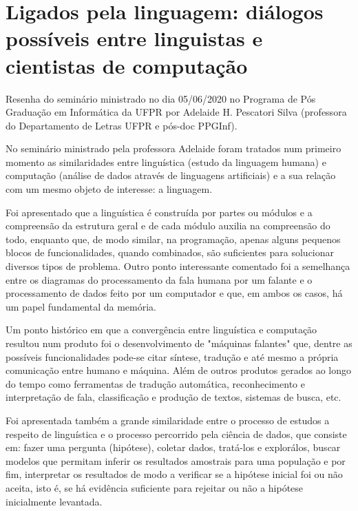 \documentclass[
	12pt,				%
	openright,			%
	twoside,			%
	a4paper,			%
	english,			%
	brazil,				%
	svgnames
	]{abntex2}\usepackage[]{graphicx}\usepackage[]{color}
\begin{document}
\chapter{Ligados pela linguagem: diálogos possíveis entre linguistas e cientistas de computação}
\label{cap:res6}


Resenha do seminário ministrado no dia 05/06/2020 no Programa de Pós Graduação em Informática da UFPR por Adelaide H. Pescatori Silva (professora do Departamento de Letras UFPR e pós-doc PPGInf).

No seminário ministrado pela professora Adelaide foram tratados num primeiro momento as similaridades entre linguística (estudo da linguagem humana) e computação (análise de dados através de linguagens artificiais) e a sua relação com um mesmo objeto de interesse: a linguagem. 

Foi apresentado que a linguística é construída por partes ou módulos e a compreensão da estrutura geral e de cada módulo auxilia na compreensão do todo, enquanto que, de modo similar, na programação, apenas alguns pequenos blocos de funcionalidades, quando combinados, são suficientes para solucionar diversos tipos de problema. Outro ponto interessante comentado foi a semelhança entre os diagramas do processamento da fala humana por um falante e o processamento de dados feito por um computador e que, em ambos os casos, há um papel fundamental da memória.

Um ponto histórico em que a convergência entre linguística e computação resultou num produto foi o desenvolvimento de "máquinas falantes" que, dentre as possíveis funcionalidades pode-se citar síntese, tradução e até mesmo a própria comunicação entre humano e máquina. Além de outros produtos gerados ao longo do tempo como ferramentas de tradução automática, reconhecimento e interpretação de fala, classificação e produção de textos, sistemas de busca, etc.

Foi apresentada também a grande similaridade entre o processo de estudos a respeito de linguística e o processo percorrido pela ciência de dados, que consiste em: fazer uma pergunta (hipótese), coletar dados, tratá-los e explorálos, buscar modelos que permitam inferir os resultados amostrais para uma população e por fim, interpretar os resultados de modo a verificar se a hipótese inicial foi ou não aceita, isto é, se há evidência suficiente para rejeitar ou não a hipótese inicialmente levantada.
\end{document}
